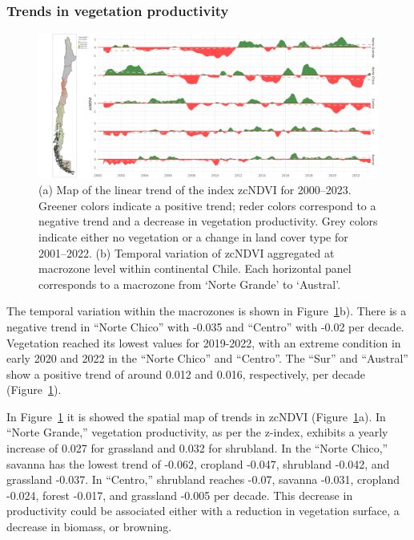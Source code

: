 \documentclass[
  authoryear,
  preprint,
  3p,
  onecolumn]{elsarticle}
\begin{document}
\hypertarget{trends-in-vegetation-productivity}{%
\subsubsection{Trends in vegetation
productivity}\label{trends-in-vegetation-productivity}}

\begin{figure}[!ht]

{\centering \includegraphics{../output/figs/temporal_variation_zcNDVI6_macrozonas_con_mapa.png}

}

\caption{\label{fig-zcNDVI_var}(a) Map of the linear trend of the index
zcNDVI for 2000--2023. Greener colors indicate a positive trend; reder
colors correspond to a negative trend and a decrease in vegetation
productivity. Grey colors indicate either no vegetation or a change in
land cover type for 2001--2022. (b) Temporal variation of zcNDVI
aggregated at macrozone level within continental Chile. Each horizontal
panel corresponds to a macrozone from `Norte Grande' to `Austral'.}

\end{figure}

The temporal variation within the macrozones is shown in
Figure~\ref{fig-zcNDVI_var}b). There is a negative trend in ``Norte
Chico'' with -0.035 and ``Centro'' with -0.02 per decade. Vegetation
reached its lowest values for 2019-2022, with an extreme condition in
early 2020 and 2022 in the ``Norte Chico'' and ``Centro''. The ``Sur''
and ``Austral'' show a positive trend of around 0.012 and 0.016,
respectively, per decade (Figure~\ref{fig-zcNDVI_var}).

In Figure~\ref{fig-zcNDVI_var} it is showed the spatial map of trends in
zcNDVI (Figure~\ref{fig-zcNDVI_var}a). In ``Norte Grande,'' vegetation
productivity, as per the z-index, exhibits a yearly increase of 0.027
for grassland and 0.032 for shrubland. In the ``Norte Chico,'' savanna
has the lowest trend of -0.062, cropland -0.047, shrubland -0.042, and
grassland -0.037. In ``Centro,'' shrubland reaches -0.07, savanna
-0.031, cropland -0.024, forest -0.017, and grassland -0.005 per decade.
This decrease in productivity could be associated either with a
reduction in vegetation surface, a decrease in biomass, or browning.
\end{document}
